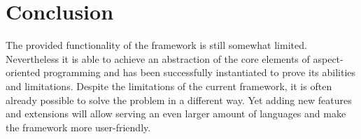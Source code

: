 \documentclass[a4paper]{report}
\begin{document}
\chapter{Conclusion}
\label{chap:Conclusion}
The provided functionality of the framework is still somewhat limited. Nevertheless it is able to achieve an abstraction of the core elements of aspect-oriented programming and has been successfully instantiated to prove its abilities and limitations. Despite the limitations of the current framework, it is often already possible to solve the problem in a different way. Yet adding new features and extensions will allow serving an even larger amount of languages and make the framework more user-friendly.



\end{document}
